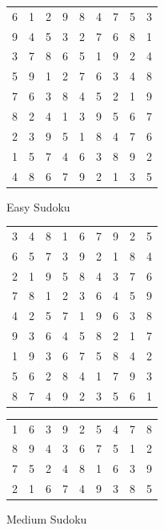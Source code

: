 \documentclass{article}
\begin{document}
\begin{titlepage}
\begin{figure}[H]
\begin{minipage}[c]{0.45\linewidth}
\centering
\begin{tabular}{ |ccc|ccc|ccc| } 
\hline
 6 & 1 & 2 & 9 & 8 & 4 & 7 & 5 & 3 \\ 
 9 & 4 & 5 & 3 & 2 & 7 & 6 & 8 & 1 \\ 
 3 & 7 & 8 & 6 & 5 & 1 & 9 & 2 & 4 \\ 
\hline
 5 & 9 & 1 & 2 & 7 & 6 & 3 & 4 & 8 \\
 7 & 6 & 3 & 8 & 4 & 5 & 2 & 1 & 9 \\
 8 & 2 & 4 & 1 & 3 & 9 & 5 & 6 & 7 \\
\hline
 2 & 3 & 9 & 5 & 1 & 8 & 4 & 7 & 6 \\
 1 & 5 & 7 & 4 & 6 & 3 & 8 & 9 & 2 \\
 4 & 8 & 6 & 7 & 9 & 2 & 1 & 3 & 5 \\
\hline
\end{tabular}
\caption{Easy Sudoku}
\end{minipage}
\hfill
\begin{minipage}[c]{0.45\linewidth}
\centering
\begin{tabular}{ |ccc|ccc|ccc| } 
\hline
 3 & 4 & 8 & 1 & 6 & 7 & 9 & 2 & 5 \\
 6 & 5 & 7 & 3 & 9 & 2 & 1 & 8 & 4 \\
 2 & 1 & 9 & 5 & 8 & 4 & 3 & 7 & 6 \\
\hline
 7 & 8 & 1 & 2 & 3 & 6 & 4 & 5 & 9 \\
 4 & 2 & 5 & 7 & 1 & 9 & 6 & 3 & 8 \\
 9 & 3 & 6 & 4 & 5 & 8 & 2 & 1 & 7 \\
\hline
 1 & 9 & 3 & 6 & 7 & 5 & 8 & 4 & 2 \\
 5 & 6 & 2 & 8 & 4 & 1 & 7 & 9 & 3 \\
 8 & 7 & 4 & 9 & 2 & 3 & 5 & 6 & 1 \\
\hline
\end{tabular}
\caption{Medium Sudoku}
\end{minipage}%
\hfill
\begin{minipage}[c]{0.45\linewidth}
\centering
\begin{tabular}{ |ccc|ccc|ccc| } 
\hline
 1 & 6 & 3 & 9 & 2 & 5 & 4 & 7 & 8 \\
 8 & 9 & 4 & 3 & 6 & 7 & 5 & 1 & 2 \\
 7 & 5 & 2 & 4 & 8 & 1 & 6 & 3 & 9 \\
\hline
 2 & 1 & 6 & 7 & 4 & 9 & 3 & 8 & 5 \\

\end{tabular}
\end{minipage}
\end{figure}
\end{titlepage}
\end{document}
